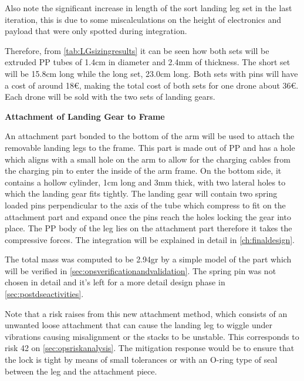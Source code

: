 Also note the significant increase in length of the sort landing leg set in the last iteration, this is due to some miscalculations on the height of electronics and payload that were only spotted during integration.

Therefore, from \autoref{tab:LGsizingresults} it can be seen how both sets will be extruded PP tubes of 1.4cm in diameter and 2.4mm of thickness. The short set will be 15.8cm long while the long set, 23.0cm long. Both sets with pins will have a cost of around 18€, making the total cost of both sets for one drone about 36€. Each drone will be sold with the two sets of landing gears.

\textbf{Attachment of Landing Gear to Frame} 

An attachment part bonded to the bottom of the arm will be used to attach the removable landing legs to the frame. This part is made out of PP and has a hole which aligns with a small hole on the arm to allow for the charging cables from the charging pin to enter the inside of the arm frame. On the bottom side, it contains a hollow cylinder, 1cm long and 3mm thick, with two lateral holes to which the landing gear fits tightly. The landing gear will contain two spring loaded pins perpendicular to the axis of the tube which compress to fit on the attachment part and expand once the pins reach the holes locking the gear into place. The PP body of the leg lies on the attachment part therefore it takes the compressive forces. The integration will be explained in detail in \autoref{ch:finaldesign}.

The total mass was computed to be 2.94gr by a simple model of the part which will be verified in \autoref{sec:opsverificationandvalidation}. The spring pin was not chosen in detail and it's left for a more detail design phase in \autoref{sec:postdseactivities}. 

Note that a risk raises from this new attachment method, which consists of an unwanted loose attachment that can cause the landing leg to wiggle under vibrations causing misalignment or the stacks to be unstable. This corresponds to risk 42 on \autoref{sec:opsriskanalysis}. The mitigation response would be to ensure that the lock is tight by means of small tolerances or with an O-ring type of seal between the leg and the attachment piece.



